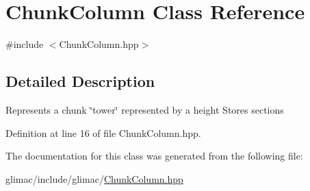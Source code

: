 \hypertarget{class_chunk_column}{}\section{Chunk\+Column Class Reference}
\label{class_chunk_column}


{\ttfamily \#include $<$Chunk\+Column.\+hpp$>$}



\subsection{Detailed Description}
Represents a chunk \char`\"{}tower\char`\"{} represented by a height Stores sections 

Definition at line 16 of file Chunk\+Column.\+hpp.



The documentation for this class was generated from the following file\+:\begin{DoxyCompactItemize}
\item 
glimac/include/glimac/\hyperlink{_chunk_column_8hpp}{Chunk\+Column.\+hpp}\end{DoxyCompactItemize}
